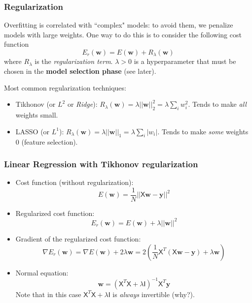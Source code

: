 \documentclass{beamer}
\begin{document}
	
	\begin{frame}
		\frametitle{Regularization}
		
		Overfitting is correlated with ``complex" models: to avoid them, we penalize models with large weights. One way to do this is to consider the following cost function
		\begin{equation*}
			E_{r}(\bm{w}) = E(\bm{w}) + R_{\lambda}(\bm{w})
		\end{equation*}
		where $R_{\lambda}$ is the \textsl{regularization term}. $\lambda > 0$ is a hyperparameter that must be chosen in the \textbf{model selection phase} (see later).
		
		\vspace{5mm}
		
		Most common regularization techniques:
		\begin{itemize}
			\item Tikhonov (or $L^2$ or \textit{Ridge}): $R_{\lambda}(\bm{w}) = \lambda ||\bm{w}||^2_2 = \lambda \sum_i w_i^2$. Tends to make \textit{all} weights small.
			\item LASSO (or $L^1$): $R_{\lambda}(\bm{w}) = \lambda ||\bm{w}||_1 = \lambda \sum_i |w_i|$. Tends to make \textit{some} weights $0$ (feature selection).
		\end{itemize}
	\end{frame}
	
	\begin{frame}
		\frametitle{Linear Regression with Tikhonov regularization}
		\begin{itemize}
			\item Cost function (without regularization):
			\begin{equation*}
				E(\bm{w}) = \frac{1}{N} ||\mathsf{X} \bm{w} - \bm{y}||^2
			\end{equation*}
			\item Regularized cost function:
			\begin{equation*}
				E_{r}(\bm{w}) = E(\bm{w}) + \lambda ||\bm{w}||^2
			\end{equation*}
			\item Gradient of the regularized cost function:
			\begin{equation*}
				\nabla E_r(\bm{w}) = \nabla E(\bm{w}) + 2 \lambda \bm{w} = 2\left(\frac{1}{N}\mathsf{X}^T(\mathsf{X}\bm{w} - \bm{y}) + \lambda \bm{w}\right)
			\end{equation*}
			\item Normal equation:
			\begin{equation*}
				\bm{w} = (\mathsf{X}^T\mathsf{X} + \lambda \mathsf{I})^{-1}\mathsf{X}^T\bm{y}
			\end{equation*}
			Note that in this case $\mathsf{X}^T\mathsf{X} + \lambda \mathsf{I}$ is \textsl{always} invertible (why?).
		\end{itemize}
		
		
	\end{frame}
	
\end{document}
